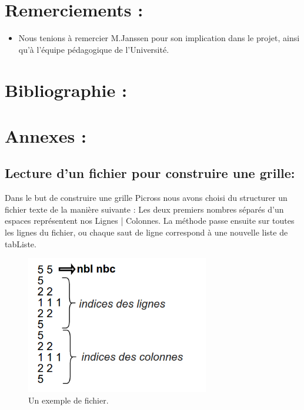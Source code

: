 \documentclass{article}
\begin{document}
\section{Remerciements :}
\begin{itemize}
\item Nous tenions à remercier M.Janssen pour son implication dans le projet, ainsi qu'à l'équipe pédagogique de l'Université.
\end{itemize}
\section{Bibliographie :}
\section{Annexes :}
\subsection{Lecture d'un fichier pour construire une grille:}
Dans le but de construire une grille Picross nous avons choisi du structurer un fichier texte de la manière suivante :\newline
Les deux premiers nombres séparés d'un espaces représentent nos Lignes | Colonnes.
La méthode passe ensuite sur toutes les lignes du fichier, ou chaque saut de ligne correspond à une nouvelle liste de tabListe.
\begin{figure}[h]
\begin{center}
\includegraphics[width=8cm]{ex2}
\end{center}
\caption{Un exemple de fichier.}
\end{figure}
\end{document}
